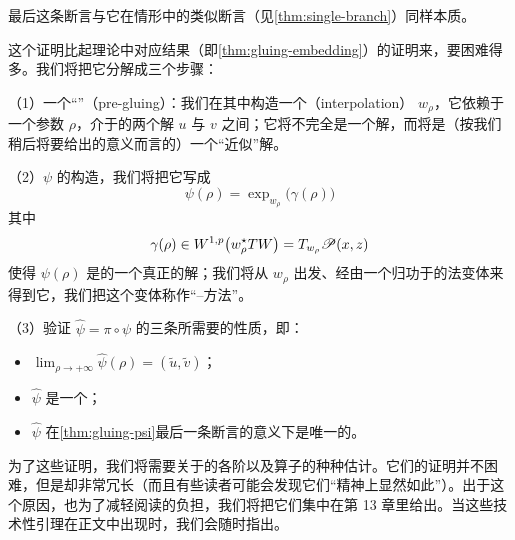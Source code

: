 \begin{remark}\label{thm:last-assertion-essential}
最后这条断言与它在\trMorse{}情形中的类似断言（见\cref{thm:single-branch}）同样本质。
\end{remark}

这个证明比起\trMorse{}理论中对应结果（即\cref{thm:gluing-embedding}）的证明来，要困难得多。我们将把它分解成三个步骤：

（1）一个“\textbf{\trPregluing}”（pre-gluing）：我们在其中构造一个\textbf{\trInterpolation}（interpolation） $w_{\rho}$，它依赖于一个参数 $\rho$，介于\trFloerEquation{}的两个解 $u$ 与 $v$ 之间；它将不完全是一个解，而将是（按我们稍后将要给出的意义而言的）一个“近似”解。

（2）$\psi$ 的构造，我们将把它写成
\[
\psi(\rho)=\exp_{w_{\rho}}\bigl(\gamma(\rho)\bigr)
\]
其中
\[
\gamma(\rho)\in W^{1,p}\bigl(w_{\rho}^{\star}TW\bigr)=T_{w_{\rho}}\mathscr{P}(x,z)
\]
使得 $\psi(\rho)$ 是\trFloerEquation{}的一个真正的解；我们将从 $w_{\rho}$ 出发、经由一个归功于\trPicard{}的\trNewton{}法变体来得到它，我们把这个变体称作“\trNewton--\trPicard{}方法”。

（3）验证 $\widehat{\psi}=\pi\circ\psi$ 的三条所需要的性质，即：
\begin{itemize}
\item $\lim_{\rho\to+\infty}\widehat{\psi}(\rho)=(\widetilde{u},\widetilde{v})$；
\item $\widehat{\psi}$ 是一个\trEmbedding；
\item $\widehat{\psi}$ 在\cref{thm:gluing-psi}最后一条断言的意义下是唯一的。
\end{itemize}

为了这些证明，我们将需要关于\trExponentialMap{}的各阶\trDifferential{}以及\trFloer{}算子的种种估计。它们的证明并不困难，但是却非常冗长（而且有些读者可能会发现它们“精神上显然如此”）。出于这个原因，也为了减轻阅读的负担，我们将把它们集中在第 13 章里给出。当这些技术性引理在正文中出现时，我们会随时指出。
